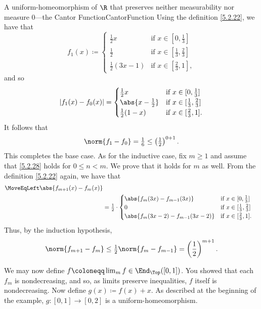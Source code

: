 \begin{exm}{A uniform-homeomorphism of $\R$ that preserves neither measurability nor measure $0$---the Cantor Function}{CantorFunction}
Using the definition \eqref{5.2.22}, we have that
\begin{equation}
f_1(x)\coloneqq \begin{cases}\tfrac{1}{2}x & \text{if }x\in [0,\tfrac{1}{3}] \\ \tfrac{1}{2} & \text{if }x\in [\tfrac{1}{3},\tfrac{2}{3}] \\ \tfrac{1}{2}(3x-1) & \text{if }x\in [\tfrac{2}{3},1],\end{cases}
\end{equation}
and so
\begin{equation}
\left| f_1(x)-f_0(x)\right| =\begin{cases}\tfrac{1}{2}x & \text{if }x\in [0,\tfrac{1}{3}] \\ \abs{x-\tfrac{1}{2}} & \text{if }x\in [\tfrac{1}{3},\tfrac{2}{3}] \\ \tfrac{1}{2}(1-x) & \text{if }x\in [\tfrac{2}{3},1].\end{cases}
\end{equation}
It follows that
\begin{equation}
\norm{f_1-f_0}=\tfrac{1}{6}\leq \left( \tfrac{1}{2}\right) ^{0+1}.
\end{equation}
This completes the base case.  As for the inductive case, fix $m\geq 1$ and assume that \eqref{5.2.28} holds for $0\leq n<m$.  We prove that it holds for $m$ as well.  From the definition \eqref{5.2.22} again, we have that
{\small
\begin{equation}
\begin{split}
\MoveEqLeft
\abs{f_{m+1}(x)-f_m(x)} \\
& =\tfrac{1}{2}\cdot \begin{cases}\abs{f_m(3x)-f_{m-1}(3x)} & \text{if }x\in [0,\tfrac{1}{3}] \\ 0 & \text{if }x\in [\tfrac{1}{3},\tfrac{2}{3}] \\ \abs{f_m(3x-2)-f_{m-1}(3x-2)} & \text{if }x\in [\tfrac{2}{3},1].\end{cases}
\end{split}
\end{equation}
}
Thus, by the induction hypothesis,
\begin{equation}
\norm{f_{m+1}-f_m}\leq \tfrac{1}{2}\norm{f_m-f_{m-1}}=\left( \frac{1}{2}\right) ^{m+1}.
\end{equation}

We may now define $f\coloneqq \lim _mf\in \End _{\Top}([0,1])$.  You showed that each $f_m$ is nondecreasing, and so, as limits preserve inequalities, $f$ itself is nondecreasing.  Now define $g(x)\coloneqq f(x)+x$.  As described at the beginning of the example, $g\colon [0,1]\rightarrow [0,2]$ is a uniform-homeomorphism.


\end{exm}
